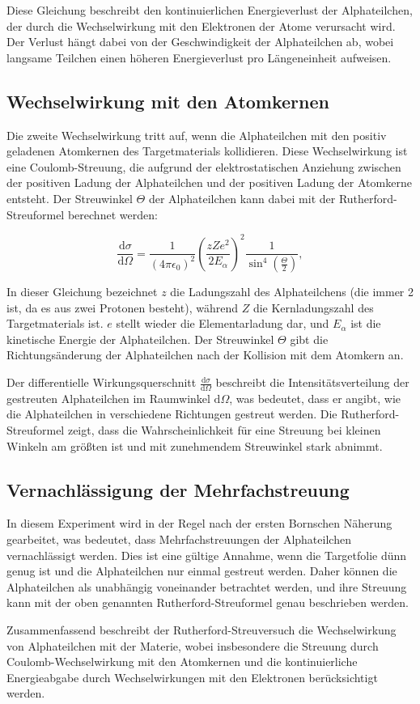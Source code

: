 Diese Gleichung beschreibt den kontinuierlichen Energieverlust der Alphateilchen, der durch die Wechselwirkung mit den Elektronen der Atome verursacht wird. Der Verlust hängt dabei von der Geschwindigkeit der Alphateilchen ab, wobei langsame Teilchen einen höheren Energieverlust pro Längeneinheit aufweisen.

\subsection*{Wechselwirkung mit den Atomkernen}
Die zweite Wechselwirkung tritt auf, wenn die Alphateilchen mit den positiv geladenen Atomkernen des Targetmaterials kollidieren. Diese Wechselwirkung ist eine Coulomb-Streuung, die aufgrund der elektrostatischen Anziehung zwischen der positiven Ladung der Alphateilchen und der positiven Ladung der Atomkerne entsteht. Der Streuwinkel $\Theta$ der Alphateilchen kann dabei mit der Rutherford-Streuformel berechnet werden:

\[
\frac{\mathrm{d}\sigma}{\mathrm{d}\Omega} = \frac{1}{(4 \pi \epsilon_0)^2} \left( \frac{z Z e^2}{2 E_\alpha} \right)^2 \frac{1}{\sin^4\left(\frac{\Theta}{2}\right)},
\]

In dieser Gleichung bezeichnet $z$ die Ladungszahl des Alphateilchens (die immer 2 ist, da es aus zwei Protonen besteht), während $Z$ die Kernladungszahl des Targetmaterials ist. $e$ stellt wieder die Elementarladung dar, und $E_\alpha$ ist die kinetische Energie der Alphateilchen. Der Streuwinkel $\Theta$ gibt die Richtungsänderung der Alphateilchen nach der Kollision mit dem Atomkern an. 

Der differentielle Wirkungsquerschnitt $\frac{\mathrm{d}\sigma}{\mathrm{d}\Omega}$ beschreibt die Intensitätsverteilung der gestreuten Alphateilchen im Raumwinkel $\mathrm{d}\Omega$, was bedeutet, dass er angibt, wie die Alphateilchen in verschiedene Richtungen gestreut werden. Die Rutherford-Streuformel zeigt, dass die Wahrscheinlichkeit für eine Streuung bei kleinen Winkeln am größten ist und mit zunehmendem Streuwinkel stark abnimmt.

\subsection*{Vernachlässigung der Mehrfachstreuung}
In diesem Experiment wird in der Regel nach der ersten Bornschen Näherung gearbeitet, was bedeutet, dass Mehrfachstreuungen der Alphateilchen vernachlässigt werden. Dies ist eine gültige Annahme, wenn die Targetfolie dünn genug ist und die Alphateilchen nur einmal gestreut werden. Daher können die Alphateilchen als unabhängig voneinander betrachtet werden, und ihre Streuung kann mit der oben genannten Rutherford-Streuformel genau beschrieben werden.

Zusammenfassend beschreibt der Rutherford-Streuversuch die Wechselwirkung von Alphateilchen mit der Materie, wobei insbesondere die Streuung durch Coulomb-Wechselwirkung mit den Atomkernen und die kontinuierliche Energieabgabe durch Wechselwirkungen mit den Elektronen berücksichtigt werden.

